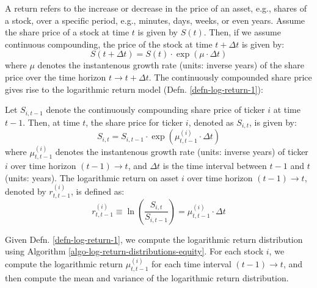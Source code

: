 \documentclass[11pt]{article}
\theoremstyle{definition}
\begin{document}
A return refers to the increase or decrease in the price of an asset, e.g., shares of a stock, over a specific period, e.g., minutes, days, weeks, or even years. 
Assume the share price of a stock at time $t$ is given by $S(t)$. Then, if we assume continuous compounding, the price of the stock at time $t+\Delta{t}$ is given by:
\begin{equation}
    S(t+\Delta{t}) = S(t)\cdot\exp\left(\mu\cdot{\Delta{t}}\right)
\end{equation}
where $\mu$ denotes the instantenous growth rate (units: inverse years) of the share price over the time horizon $t\rightarrow{t+\Delta{t}}$. 
The continuously compounded share price gives rise to the logarithmic return model (Defn. \ref{defn-log-return-1}):
\begin{definition}\label{defn-log-return-1}
Let $S_{i,t-1}$ denote the continuously compounding share price of ticker $i$ at time $t-1$. Then, at time $t$, the share price for ticker $i$, denoted as $S_{i,t}$,
is given by:
\begin{equation}
    S_{i,t} = S_{i,t-1}\cdot\exp\left(\mu^{(i)}_{t,t-1}\cdot{\Delta{t}}\right)
\end{equation}
where $\mu^{(i)}_{t,t-1}$ denotes the instantenous growth rate (units: inverse years) of ticker $i$ over time horizon $(t-1)\rightarrow{t}$, 
and $\Delta{t}$ is the time interval between $t-1$ and $t$ (units: years). The logarithmic return on asset $i$ over time horizon $(t-1)\rightarrow{t}$, 
denoted by $r^{(i)}_{t,t-1}$, is defined as:
\begin{equation}
r^{(i)}_{t,t-1} \equiv \ln\left(\frac{S_{i,t}}{S_{i,t-1}}\right) = \mu^{(i)}_{t,t-1}\cdot{\Delta{t}}
\end{equation} 
\end{definition}
Given Defn. \ref{defn-log-return-1}, we compute the logarithmic return distribution using Algorithm \ref{algo-log-return-distributions-equity}.
For each stock $i$, we compute the logarithmic return $\mu^{(i)}_{t,t-1}$ for each time interval $(t-1)\rightarrow{t}$, and then compute the mean and variance of the logarithmic return distribution.
\end{document}
